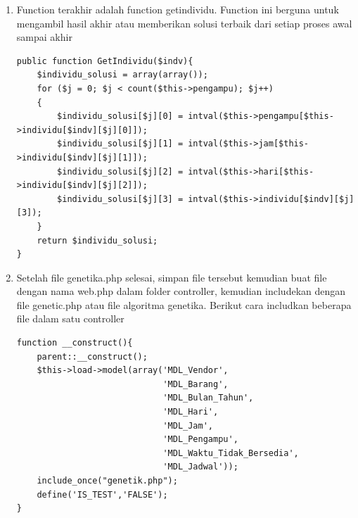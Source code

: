 \begin{enumerate}
\begin{enumerate}
	\item Function terakhir adalah function getindividu. Function ini berguna untuk mengambil hasil akhir atau memberikan solusi terbaik dari setiap proses awal sampai akhir
\begin{lstlisting}
public function GetIndividu($indv){
    $individu_solusi = array(array());
    for ($j = 0; $j < count($this->pengampu); $j++)
    {
        $individu_solusi[$j][0] = intval($this->pengampu[$this->individu[$indv][$j][0]]);
        $individu_solusi[$j][1] = intval($this->jam[$this->individu[$indv][$j][1]]);
        $individu_solusi[$j][2] = intval($this->hari[$this->individu[$indv][$j][2]]);       
        $individu_solusi[$j][3] = intval($this->individu[$indv][$j][3]);
    }
    return $individu_solusi;
}
\end{lstlisting}
		
	\item Setelah file genetika.php selesai, simpan file tersebut kemudian buat file dengan nama web.php dalam folder controller, kemudian includekan dengan file genetic.php atau file algoritma genetika. Berikut cara includkan beberapa file dalam satu controller
\begin{lstlisting}
function __construct(){
    parent::__construct();
    $this->load->model(array('MDL_Vendor',
    						 'MDL_Barang',
    						 'MDL_Bulan_Tahun',
    						 'MDL_Hari',
    						 'MDL_Jam',
    						 'MDL_Pengampu',
    						 'MDL_Waktu_Tidak_Bersedia',
    						 'MDL_Jadwal'));
    include_once("genetik.php");
    define('IS_TEST','FALSE');
}
\end{lstlisting}
	

\end{enumerate}
\end{enumerate}
